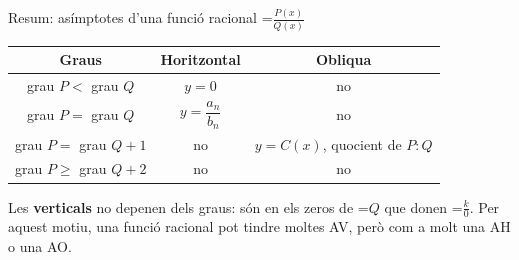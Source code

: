 \documentclass[11pt,a4paper]{article}
\newcommand{\lt}{<}\newcommand{\gt}{>}
\newcommand{\fmm}[1]{\setbox0=\hbox{$#1$}\ifdim\wd0>\linewidth\[#1\]\else\mbox{\box0}\fi}
\begin{document}
  
\begin{fmprop}{Resum: asímptotes d'una funció racional \fmm{\frac{P(x)}{Q(x)}}}
\begin{center}\renewcommand{\arraystretch}{1.5}\begin{tabular}{ccc}\toprule
\textbf{Graus} & \textbf{Horitzontal} & \textbf{Obliqua}\\\midrule
grau $P\lt$ grau $Q$ & $y=0$ & no\\
grau $P=$ grau $Q$ & $y=\dfrac{a_n}{b_n}$ & no\\
grau $P=$ grau $Q+1$ & no & $y=C(x)$, quocient de $P:Q$\\
grau $P\geq$ grau $Q+2$ & no & no\\
\bottomrule\end{tabular}\end{center}

      
\begin{fmnote}Les \textbf{verticals} no depenen dels graus: són en els zeros de \fmm{Q} que donen \fmm{\frac k0}. Per aquest motiu, una funció racional pot tindre moltes AV, però com a molt una AH o una AO.\end{fmnote}
\end{fmprop}

  
\end{document}
